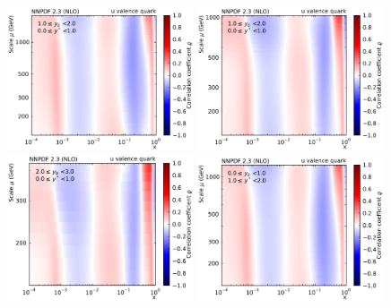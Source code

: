 \begin{figure}[htbp]
    \centering
    \includegraphics[width=0.49\textwidth]{figures/pdf_constraints/corr_PTMAXEXPYS_YBYS_NLO_FINALBINS_NNPDF23_u_valence_quark_ys0_0yb0_0_cl.pdf}\hfill
    \includegraphics[width=0.49\textwidth]{figures/pdf_constraints/corr_PTMAXEXPYS_YBYS_NLO_FINALBINS_NNPDF23_u_valence_quark_ys0_0yb1_0_cl.pdf}\hfill
    \includegraphics[width=0.49\textwidth]{figures/pdf_constraints/corr_PTMAXEXPYS_YBYS_NLO_FINALBINS_NNPDF23_u_valence_quark_ys0_0yb2_0_cl.pdf}\hfill
    \includegraphics[width=0.49\textwidth]{figures/pdf_constraints/corr_PTMAXEXPYS_YBYS_NLO_FINALBINS_NNPDF23_u_valence_quark_ys1_0yb0_0_cl.pdf}\hfill

\end{figure}
